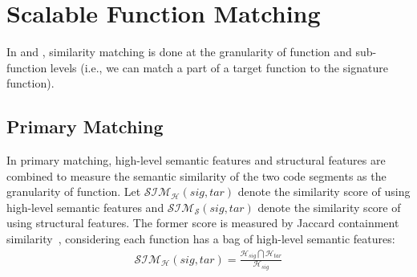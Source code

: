 

\section{Scalable Function Matching}\label{sec:func_match}


In \tool and \toolNew, similarity matching is done at the granularity of function and sub-function levels (i.e., we can match a part of a target function to the signature function).




\subsection{Primary Matching} \label{subsec:matching:primary}
In primary matching, high-level semantic features and structural features are combined to measure the semantic similarity of the two code segments as the granularity of function. Let $\mathcal{SIM_{H}}(sig, tar)$  denote the similarity score of using high-level semantic features and $\mathcal{SIM_{S}}(sig, tar)$ denote the similarity score of using structural features.
The former score is measured by Jaccard containment similarity~\cite{agrawal2010indexing}, considering each function has a bag of high-level semantic features:
\begin{equation}
\begin{aligned}
\mathcal{SIM_{H}}(sig, tar) = \frac{\mathcal{H}_{sig} \bigcap \mathcal{H}_{tar}}{\mathcal{H}_{sig}}
\end{aligned}
\end{equation}


